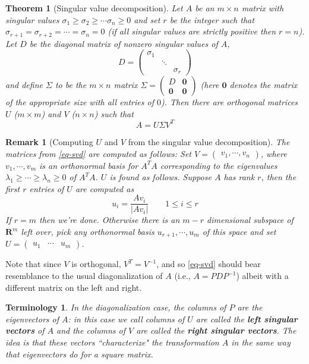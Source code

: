 \documentclass[12pt]{article}
\numberwithin{equation}{subsection}
\numberwithin{figure}{subsection}
\newtheorem{thm}[subsection]{Theorem}
\theoremstyle{note}
\newtheorem{remark}[subsection]{Remark}
\newtheorem{terminology}[subsection]{Terminology}
\newcommand{\R}{\mathbf{R}}
\newcommand\m[1]{\begin{pmatrix}#1\end{pmatrix}}
\begin{document}
\begin{thm}[Singular value decomposition]Let $A$ be an $m\times n$ matrix with singular values $\sigma_1\geq \sigma_2\geq \cdots\sigma_n\geq 0$ and set $r$ be the integer such that $\sigma_{r+1}=\sigma_{r+2}=\cdots=\sigma_n=0$ (if all singular values are strictly positive then $r=n$). Let $D$ be the diagonal matrix of \textit{nonzero} singular values of $A$, \[D=\m{ \sigma_1 & & \\  & \ddots & \\ && \sigma_r}\] and define $\Sigma$ to be the $m\times n$ matrix $\Sigma= \m{ D & \mathbf{0} \\ \mathbf{0} & \mathbf{0}}$ (here $\mathbf{0}$ denotes the matrix of the appropriate size with all entries of $0$). Then there are orthogonal matrices $U$ ($m\times m$) and $V$ ($n\times n$) such that \begin{equation} A=U\Sigma V^T\label{eq-svd} \end{equation}
\end{thm}
\begin{remark}[Computing $U$ and $V$ from the singular value decomposition] The matrices from \eqref{eq-svd} are computed as follows: Set $V=\m{v_1, \cdots,v_n}$, where $v_1,\cdots,v_m$ is an orthonormal basis for $A^TA$ corresponding to the eigenvalues $\lambda_1\geq \cdots \geq \lambda_n\geq 0$ of $A^TA$. $U$ is found as follows. Suppose $A$ has rank $r$, then the first $r$ entries of $U$ are computed as \begin{equation} u_i=\dfrac{Av_i}{|Av_i|} \qquad 1\leq i\leq r\end{equation} If $r=m$ then we're done. Otherwise there is an $m-r$ dimensional subspace of $\R^m$ left over, pick \textit{any} orthonormal basis $u_{r+1},\cdots,u_m$ of this space and set $U=\m{ u_1 & \cdots & u_m}$.\end{remark}

Note that since $V$ is orthogonal, $V^T=V^{-1}$, and so \eqref{eq-svd} should bear resemblance to the usual diagonalization of $A$ (i.e., $A=PDP^{-1}$) albeit with a different matrix on the left and right. 

\begin{terminology} In the diagonalization case, the columns of $P$ are the eigenvectors of $A$: in this case we call columns of $U$ are called the \textbf{left singular vectors} of $A$ and the columns of $V$ are called the \textbf{right singular vectors}. The idea is that these vectors ``characterize" the transformation $A$ in the same way that eigenvectors do for a square matrix. 
\end{terminology}
\end{document}
